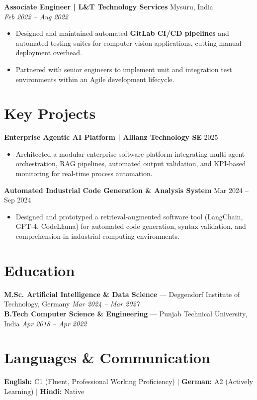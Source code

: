 \documentclass[8.5pt,a4paper]{article}
\begin{document}
\textbf{Associate Engineer \;|\; L\&T Technology Services} \hfill Mysuru, India\\
\textit{Feb 2022 -- Aug 2022}
\begin{itemize}
    \item Designed and maintained automated \textbf{GitLab CI/CD pipelines} and automated testing suites for computer vision applications, cutting manual deployment overhead.
    \item Partnered with senior engineers to implement unit and integration test environments within an Agile development lifecycle.
\end{itemize}


\section{Key Projects}

\textbf{Enterprise Agentic AI Platform \;|\; Allianz Technology SE} \hfill 2025
\begin{itemize}
    \item Architected a modular enterprise software platform integrating multi-agent orchestration, RAG pipelines, automated output validation, and KPI-based monitoring for real-time process automation.
\end{itemize}

\textbf{Automated Industrial Code Generation \& Analysis System} \hfill Mar 2024 -- Sep 2024
\begin{itemize}
    \item Designed and prototyped a retrieval-augmented software tool (LangChain, GPT-4, CodeLlama) for automated code generation, syntax validation, and comprehension in industrial computing environments.
\end{itemize}


\section{Education}

\textbf{M.Sc. Artificial Intelligence \& Data Science} --- Deggendorf Institute of Technology, Germany \hfill \textit{Mar 2024 -- Mar 2027}\\
\textbf{B.Tech Computer Science \& Engineering} --- Punjab Technical University, India \hfill \textit{Apr 2018 -- Apr 2022}


\section{Languages \& Communication}

\textbf{English:} C1 (Fluent, Professional Working Proficiency) \quad|\quad
\textbf{German:} A2 (Actively Learning) \quad|\quad
\textbf{Hindi:} Native
\end{document}
